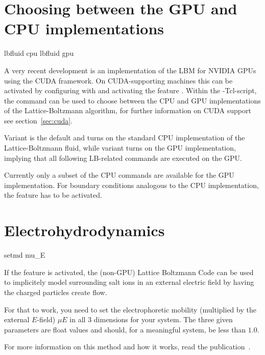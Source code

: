 \section{Choosing between the GPU and CPU implementations}
\begin{essyntax}
   lbfluid cpu
   lbfluid gpu
  \begin{features}
  \end{features}
\end{essyntax}

A very recent development is an implementation of the LBM for NVIDIA
GPUs using the CUDA framework.  On CUDA-supporting machines this can
be activated by configuring with  and activating the feature .
Within the \es-Tcl-script, the  command can be used to
choose between the CPU and GPU implementations of the
Lattice-Boltzmann algorithm, for further information on CUDA support
see section~\ref{sec:cuda}.

Variant  is the default and turns on the standard CPU
implementation of the Lattice-Boltzmann fluid, while variant
 turns on the GPU implementation, implying that all
following LB-related commands are executed on the GPU.

Currently only a subset of the CPU commands are available for the GPU
implementation.  For boundary conditions analogous to the CPU
implementation, the feature  has to be
activated.

\section{Electrohydrodynamics}

\begin{essyntax}
  setmd mu_E   
  \begin{features}
  \end{features}
\end{essyntax}

If the feature  is activated, the
(non-GPU) Lattice Boltzmann Code can be used to implicitely model
surrounding salt ions in an external electric field by having the
charged particles create flow.

For that to work, you need to set the electrophoretic mobility
(multiplied by the external $E$-field) $\mu E$ in all 3 dimensions for
your system. The three given parameters are float values and should,
for a meaningful system, be less than $1.0$.

For more information on this method and how it works, read the
publication~\cite{hickey10a}.

